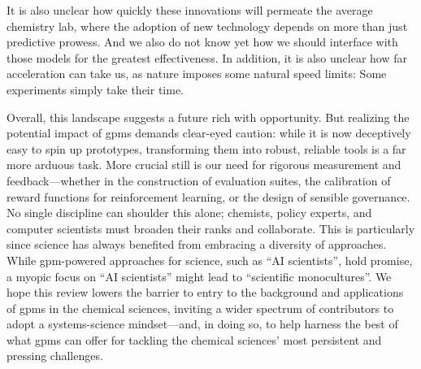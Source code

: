 It is also unclear how quickly these innovations will permeate the average chemistry lab, where the adoption of new technology depends on more than just predictive prowess. 
And we also do not know yet how we should interface with those models for the greatest effectiveness.
In addition, it is also unclear how far acceleration can take us, as nature imposes some natural speed limits: Some experiments simply take their time. 

Overall, this landscape suggests a future rich with opportunity. But realizing the potential impact of \glspl{gpm} demands clear-eyed caution: while it is now deceptively easy to spin up prototypes, transforming them into robust, reliable tools is a far more arduous task. \autocite{sculley2014machine}
More crucial still is our need for rigorous measurement and feedback---whether in the construction of evaluation suites, the calibration of reward functions for reinforcement learning, or the design of sensible governance. 
No single discipline can shoulder this alone; chemists, policy experts, and computer scientists must broaden their ranks and collaborate. 
This is particularly since science has always benefited from embracing a diversity of approaches. 
While \gls{gpm}-powered approaches for science, such as \enquote{AI scientists}, hold promise, a myopic focus on \enquote{AI scientists} might lead to \enquote{scientific monocultures}.\autocite{Savitsky_2025} 
We hope this review lowers the barrier to entry to the background and applications of \glspl{gpm} in the chemical sciences, inviting a wider spectrum of contributors to adopt a systems-science mindset---and, in doing so, to help harness the best of what \glspl{gpm} can offer for tackling the chemical sciences’ most persistent and pressing challenges.
